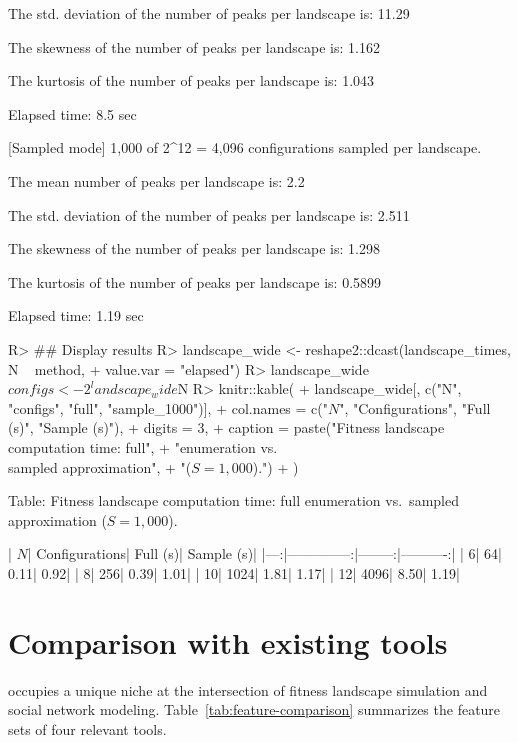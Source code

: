 \documentclass[
  article]{jss}
\begin{document}
\begin{CodeChunk}
\begin{CodeOutput}
The std. deviation of the number of peaks per landscape is: 11.29 

The skewness of the number of peaks per landscape is: 1.162 

The kurtosis of the number of peaks per landscape is: 1.043 

Elapsed time: 8.5 sec

[Sampled mode] 1,000 of 2^12 = 4,096 configurations sampled per landscape.

The mean number of peaks per landscape is: 2.2 

The std. deviation of the number of peaks per landscape is: 2.511 

The skewness of the number of peaks per landscape is: 1.298 

The kurtosis of the number of peaks per landscape is: 0.5899 

Elapsed time: 1.19 sec
\end{CodeOutput}
\begin{CodeInput}
R> ## Display results
R> landscape_wide <- reshape2::dcast(landscape_times, N ~ method,
+                                   value.var = "elapsed")
R> landscape_wide$configs <- 2^landscape_wide$N
R> knitr::kable(
+   landscape_wide[, c("N", "configs", "full", "sample_1000")],
+   col.names = c("$N$", "Configurations", "Full (s)", "Sample (s)"),
+   digits = 3,
+   caption = paste("Fitness landscape computation time: full",
+                   "enumeration vs.\\ sampled approximation",
+                   "($S = 1{,}000$).")
+ )
\end{CodeInput}


Table: Fitness landscape computation time: full enumeration vs.\ sampled approximation ($S = 1{,}000$).

| $N$| Configurations| Full (s)| Sample (s)|
|---:|--------------:|--------:|----------:|
|   6|             64|     0.11|       0.92|
|   8|            256|     0.39|       1.01|
|  10|           1024|     1.81|       1.17|
|  12|           4096|     8.50|       1.19|

\end{CodeChunk}

\section{Comparison with existing tools}\label{sec:comparison}

 occupies a unique niche at the intersection of fitness
landscape simulation and social network modeling.
Table~\ref{tab:feature-comparison} summarizes the feature sets of four
relevant tools.
\end{document}
